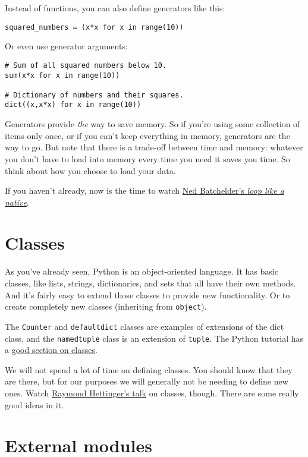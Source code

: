\documentclass[12pt]{book}
\begin{document}
Instead of functions, you can also define generators like this:

\begin{lstlisting}
squared_numbers = (x*x for x in range(10))
\end{lstlisting}

Or even use generator arguments:

\begin{lstlisting}
# Sum of all squared numbers below 10.
sum(x*x for x in range(10))

# Dictionary of numbers and their squares.
dict((x,x*x) for x in range(10))
\end{lstlisting}

Generators provide \emph{the} way to save memory. So if you're using some collection of items only once, or if you can't keep everything in memory, generators are the way to go. But note that there is a trade-off between time and memory: whatever you don't have to load into memory every time you need it saves you time. So think about how you choose to load your data.

If you haven't already, now is the time to watch \href{http://nedbatchelder.com/text/iter.html}{Ned Batchelder's \emph{loop like a native}}.

\section{Classes}

As you've already seen, Python is an object-oriented language. It has basic classes, like lists, strings, dictionaries, and sets that all have their own methods. And it's fairly easy to extend those classes to provide new functionality. Or to create completely new classes (inheriting from \texttt{object}).

The \texttt{Counter} and \texttt{defaultdict} classes are examples of extensions of the dict class, and the \texttt{namedtuple} class is an extension of \texttt{tuple}. The Python tutorial has a \href{https://docs.python.org/3/tutorial/classes.html}{good section on classes}.

We will not spend a lot of time on defining classes. You should know that they are there, but for our purposes we will generally not be needing to define new ones. Watch \href{https://www.youtube.com/watch?v=HTLu2DFOdTg}{Raymond Hettinger's talk} on classes, though. There are some really good ideas in it.

\section{External modules}
\end{document}
